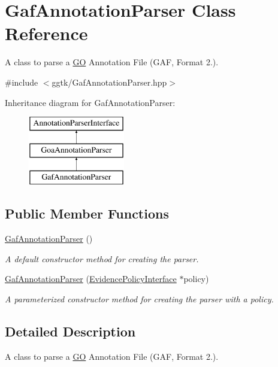 \hypertarget{classGafAnnotationParser}{}\section{Gaf\+Annotation\+Parser Class Reference}
\label{classGafAnnotationParser}


A class to parse a \hyperlink{namespaceGO}{GO} Annotation File (G\+AF, Format 2.).  




{\ttfamily \#include $<$ggtk/\+Gaf\+Annotation\+Parser.\+hpp$>$}

Inheritance diagram for Gaf\+Annotation\+Parser\+:\begin{figure}[H]
\begin{center}
\leavevmode
\includegraphics[height=3.000000cm]{classGafAnnotationParser}
\end{center}
\end{figure}
\subsection*{Public Member Functions}
\begin{DoxyCompactItemize}
\item 
\hyperlink{classGafAnnotationParser_a1ec096680cb5e3c4f1111b53cc12ce88}{Gaf\+Annotation\+Parser} ()
\begin{DoxyCompactList}\small\item\em A default constructor method for creating the parser. \end{DoxyCompactList}\item 
\hyperlink{classGafAnnotationParser_a24dc9179f8df7e913c648ea90f60e3b2}{Gaf\+Annotation\+Parser} (\hyperlink{classEvidencePolicyInterface}{Evidence\+Policy\+Interface} $\ast$policy)
\begin{DoxyCompactList}\small\item\em A parameterized constructor method for creating the parser with a policy. \end{DoxyCompactList}\end{DoxyCompactItemize}


\subsection{Detailed Description}
A class to parse a \hyperlink{namespaceGO}{GO} Annotation File (G\+AF, Format 2.). 

